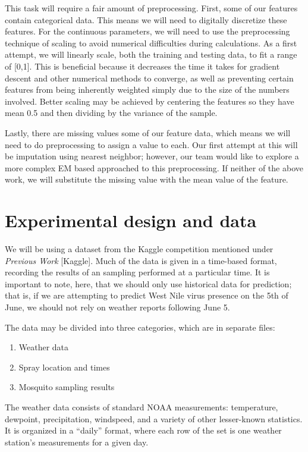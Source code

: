 \documentclass{article} %
\begin{document}
This task will require a fair amount of preprocessing. First, some of our features contain categorical data.  This means we will need to digitally discretize these features.  For the continuous parameters, we will need to use the preprocessing technique of scaling to avoid numerical difficulties during calculations.  As a first attempt, we will linearly scale, both the training and testing data, to fit a range of [0,1].  This is beneficial because it decreases the time it takes for gradient descent and other numerical methods to converge, as well as preventing certain features from being inherently weighted simply due to the size of the numbers involved.  Better scaling may be achieved by centering the features so they have mean 0.5 and then dividing by the variance of the sample.

Lastly, there are missing values some of our feature data, which means we will need to do preprocessing to assign a value to each.  Our first attempt at this will be imputation using nearest neighbor; however, our team would like to explore a more complex EM based approached to this preprocessing.  If neither of the above work, we will substitute the missing value with the mean value of the feature.



\section{Experimental design and data}

We will be using a dataset from the Kaggle competition mentioned under \textit{Previous Work} [Kaggle].  Much of the data is given in a time-based format, recording the results of an sampling performed at a particular time. It is important to note, here, that we should only use historical data for prediction; that is, if we are attempting to predict West Nile virus presence on the 5th of June, we should not rely on weather reports following June 5.   

The data may be divided into three categories, which are in separate files: 
\begin{enumerate}
	\item Weather data
	\item Spray location and times
	\item Mosquito sampling results
\end{enumerate}

The weather data consists of standard NOAA measurements: temperature, dewpoint, precipitation, windspeed, and a variety of other lesser-known statistics.  It is organized in a ``daily'' format, where each row of the set is one weather station's measurements for a given day.  
\end{document}
